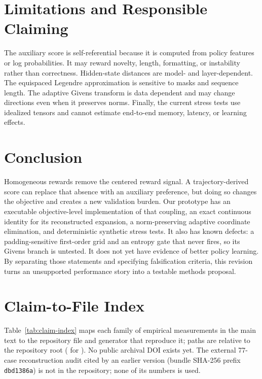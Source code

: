 \documentclass{article}
\begin{document}
\section{Limitations and Responsible Claiming}

The auxiliary score is self-referential because it is computed from policy
features or log probabilities.  It may reward novelty, length, formatting, or
instability rather than correctness.  Hidden-state distances are model- and
layer-dependent.  The equispaced Legendre approximation is sensitive to masks
and sequence length.  The adaptive Givens transform is data dependent and may
change directions even when it preserves norms.  Finally, the current stress
tests use idealized tensors and cannot estimate end-to-end memory, latency, or
learning effects.

\section{Conclusion}

Homogeneous rewards remove the centered reward signal.  A trajectory-derived
score can replace that absence with an auxiliary preference, but doing so
changes the objective and creates a new validation burden.  Our prototype has
an executable objective-level implementation of that coupling, an exact
continuous identity for its reconstructed expansion, a norm-preserving
adaptive coordinate elimination, and deterministic synthetic stress tests.  It
also has known defects: a padding-sensitive first-order grid and an entropy
gate that never fires, so its Givens branch is untested.  It does not yet have
evidence of better policy learning.  By separating those statements and specifying
falsification criteria, this revision turns an unsupported performance story
into a testable methods proposal.

\appendix
\section{Claim-to-File Index}

Table~\ref{tab:claim-index} maps each family of empirical measurements in the
main text to the repository file and generator that reproduce it; paths are
relative to the repository root ( for
).  No public archival DOI exists yet.  The external 77-case
reconstruction audit cited by an earlier version (bundle SHA-256 prefix
\texttt{dbd1386a}) is not in the repository; none of its numbers is used.
\end{document}
